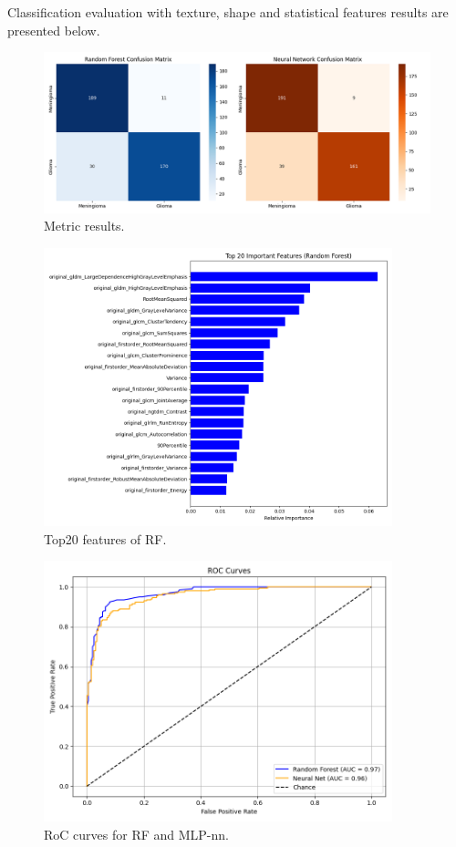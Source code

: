 \documentclass[11pt,a4paper]{article}
\begin{document}
		Classification evaluation with texture, shape and statistical features results are presented below.
	
		\begin{figure}[h]
			\centering
			\includegraphics[width=1.1\textwidth]{images/classification_pyradiomics.png}
			\caption{Metric results.}
			\label{fig1:}
		\end{figure}		

		\begin{figure}[h]
			\centering
			\includegraphics[width=0.9\textwidth]{images/top20_rf_pyradiomics.png}
			\caption{Top20 features of RF.}
			\label{fig1:}
		\end{figure}		

		\begin{figure}[H]
			\centering
			\includegraphics[width=0.9\textwidth]{images/roc_pyradiomics.png}
			\caption{RoC curves for RF and MLP-nn.}
			\label{fig1:}
		\end{figure}		
\end{document}
